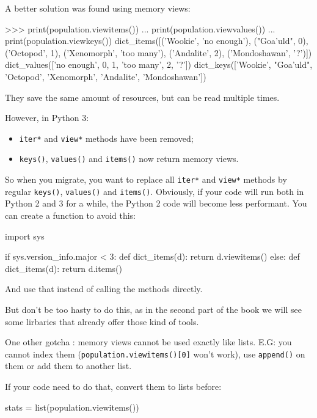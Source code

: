 A better solution was found using memory views:

\begin{py}
>>> print(population.viewitems())
... print(population.viewvalues())
... print(population.viewkeys())
dict_items([('Wookie', 'no enough'), ("Goa'uld", 0), ('Octopod', 1), ('Xenomorph', 'too many'), ('Andalite', 2), ('Mondoshawan', '?')])
dict_values(['no enough', 0, 1, 'too many', 2, '?'])
dict_keys(['Wookie', "Goa'uld", 'Octopod', 'Xenomorph', 'Andalite', 'Mondoshawan'])

\end{py}

They save the same amount of resources, but can be read multiple times.

However, in Python 3:

\begin{itemize}
    \item \lstinline{iter*} and \lstinline{view*} methods have been removed;
    \item \lstinline{keys()}, \lstinline{values()} and \lstinline{items()} now return memory views.
\end{itemize}

So when you migrate, you want to replace all \lstinline{iter*} and \lstinline{view*} methods by regular \lstinline{keys()}, \lstinline{values()} and \lstinline{items()}. Obviously, if your code will run both in Python 2 and 3 for a while, the Python 2 code will become less performant. You can create a function to avoid this:

\begin{py}
import sys

if sys.version_info.major < 3:
    def dict_items(d):
        return d.viewitems()
else:
    def dict_items(d):
        return d.items()
\end{py}

And use that instead of calling the methods directly.

But don't be too hasty to do this, as in the second part of the book we will see some lirbaries that already offer those kind of tools.

One other gotcha : memory views cannot be used exactly like lists. E.G: you cannot index them (\lstinline{population.viewitems()[0]} won't work), use \lstinline{append()} on them or add them to another list.

If your code need to do that, convert them to lists before:

\begin{py}
stats = list(population.viewitems())
\end{py}

